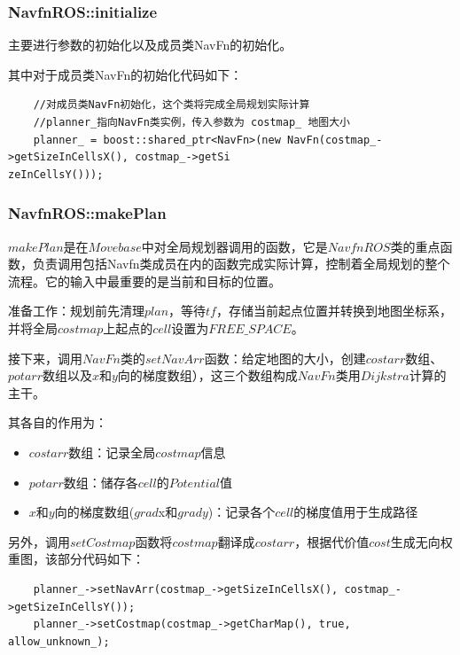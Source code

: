 \documentclass[9pt, oneside]{book}
\begin{document}
\subsubsection{NavfnROS::initialize}

主要进行参数的初始化以及成员类NavFn的初始化。

其中对于成员类NavFn的初始化代码如下：

\small
\begin{verbatim}
    //对成员类NavFn初始化，这个类将完成全局规划实际计算
    //planner_指向NavFn类实例，传入参数为 costmap_ 地图大小
    planner_ = boost::shared_ptr<NavFn>(new NavFn(costmap_->getSizeInCellsX(), costmap_->getSi
zeInCellsY()));
\end{verbatim}
\normalsize

\subsubsection{NavfnROS::makePlan}

$makePlan$是在$Movebase$中对全局规划器调用的函数，它是$NavfnROS$类的重点函数，负责调用包括Navfn类成员在内的函数完成实际计算，控制着全局规划的整个流程。它的输入中最重要的是当前和目标的位置。

准备工作：规划前先清理$plan$，等待$tf$，存储当前起点位置并转换到地图坐标系，并将全局$costmap$上起点的$cell$设置为$FREE\_SPACE$。

接下来，调用$NavFn$类的$setNavArr$函数：给定地图的大小，创建$costarr$数组、$potarr$数组以及$x$和$y$向的梯度数组），这三个数组构成$NavFn$类用$Dijkstra$计算的主干。

其各自的作用为：

\begin{itemize}
    \item $costarr$数组：记录全局$costmap$信息
    \item $potarr$数组：储存各$cell$的$Potential$值
    \item $x$和$y$向的梯度数组($grad$x和$grady$)：记录各个$cell$的梯度值用于生成路径
\end{itemize}

另外，调用$setCostmap$函数将$costmap$翻译成$costarr$，根据代价值$cost$生成无向权重图，该部分代码如下：

\begin{verbatim}
    planner_->setNavArr(costmap_->getSizeInCellsX(), costmap_->getSizeInCellsY());
    planner_->setCostmap(costmap_->getCharMap(), true, allow_unknown_);
\end{verbatim}
\end{document}
